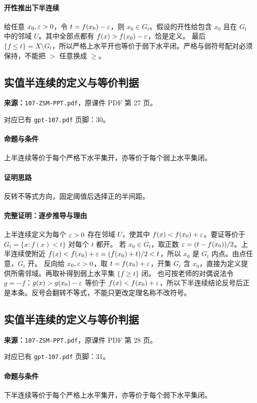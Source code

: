 \paragraph{开性推出下半连续}给任意 $x_0,\varepsilon>0$，令 $t=f(x_0)-\varepsilon$，则 $x_0\in G_t$。假设的开性给包含 $x_0$ 且在 $G_t$ 中的邻域 $U$。其中全部点都有 $f(x)>f(x_0)-\varepsilon$，恰是定义。
最后 $\{f\le t\}=X\setminus G_t$，所以严格上水平开也等价于弱下水平闭。严格与弱符号配对必须保持，不能把 $>$ 任意换成 $\ge$。

\clearpage\subsection{实值半连续的定义与等价判据}
\textbf{来源：}\texttt{107-ZSM-PPT.pdf}，原课件 PDF 第 27 页。\par
对应已有 \texttt{gpt-107.pdf} 页脚：30。\par
\paragraph{命题与条件}上半连续等价于每个严格下水平集开，亦等价于每个弱上水平集闭。
\paragraph{证明思路}反转不等式方向，固定阈值后选择正的半间距。
\paragraph{完整证明：逐步推导与理由}

上半连续定义为每个 $\varepsilon>0$ 存在邻域 $U$，使其中 $f(x)<f(x_0)+\varepsilon$。要证等价于 $G_t=\{x:f(x)<t\}$ 对每个 $t$ 都开。
若 $x_0\in G_t$，取正数 $\varepsilon=(t-f(x_0))/2$。上半连续使附近 $f(x)<f(x_0)+\varepsilon=(f(x_0)+t)/2<t$，所以 $x_0$ 是 $G_t$ 内点。由点任意，$G_t$ 开。
反向给 $x_0,\varepsilon>0$，取 $t=f(x_0)+\varepsilon$，开集 $G_t$ 含 $x_0$，直接为定义提供所需邻域。再取补得到弱上水平集 $\{f\ge t\}$ 闭。
也可按老师的对偶说法令 $g=-f$：$g(x)>g(x_0)-\varepsilon$ 等价于 $f(x)<f(x_0)+\varepsilon$，所以下半连续结论反号后正是本条。反号会翻转不等式，不能只更改定理名称不改符号。

\clearpage\subsection{实值半连续的定义与等价判据}
\textbf{来源：}\texttt{107-ZSM-PPT.pdf}，原课件 PDF 第 28 页。\par
对应已有 \texttt{gpt-107.pdf} 页脚：31。\par
\paragraph{命题与条件}下半连续等价于每个严格上水平集开，亦等价于每个弱下水平集闭。
